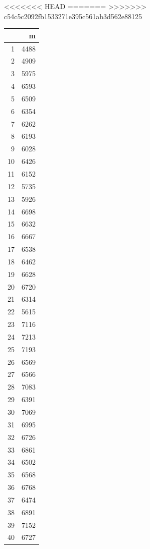 \documentclass[12pt,english,french,twoside]{book}\usepackage[]{graphicx}\usepackage[]{color}
\begin{document}
<<<<<<< HEAD
=======
>>>>>>> c54c5c2092fb1533271e395c561ab3d562e88125
\begin{table}[ht]
\centering
\begin{tabular}{rr}
  \hline
 & m \\ 
  \hline
1 & 4488 \\ 
  2 & 4909 \\ 
  3 & 5975 \\ 
  4 & 6593 \\ 
  5 & 6509 \\ 
  6 & 6354 \\ 
  7 & 6262 \\ 
  8 & 6193 \\ 
  9 & 6028 \\ 
  10 & 6426 \\ 
  11 & 6152 \\ 
  12 & 5735 \\ 
  13 & 5926 \\ 
  14 & 6698 \\ 
  15 & 6632 \\ 
  16 & 6667 \\ 
  17 & 6538 \\ 
  18 & 6462 \\ 
  19 & 6628 \\ 
  20 & 6720 \\ 
  21 & 6314 \\ 
  22 & 5615 \\ 
  23 & 7116 \\ 
  24 & 7213 \\ 
  25 & 7193 \\ 
  26 & 6569 \\ 
  27 & 6566 \\ 
  28 & 7083 \\ 
  29 & 6391 \\ 
  30 & 7069 \\ 
  31 & 6995 \\ 
  32 & 6726 \\ 
  33 & 6861 \\ 
  34 & 6502 \\ 
  35 & 6568 \\ 
  36 & 6768 \\ 
  37 & 6474 \\ 
  38 & 6891 \\ 
  39 & 7152 \\ 
  40 & 6727 \\ 

\end{tabular}
\end{table}
\end{document}

